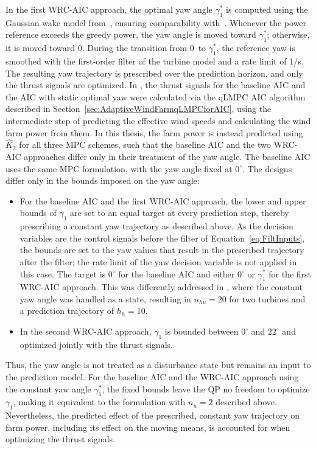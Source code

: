In the first WRC-AIC approach, the optimal yaw angle $\gamma_1^*$ is computed using the Gaussian wake model from~\cite{bastankhah2016experimental}, ensuring comparability with~\cite{boersma2019constrained}. Whenever the power reference exceeds the greedy power, the yaw angle is moved toward $\gamma_1^*$; otherwise, it is moved toward 0\textdegree. During the transition from 0\textdegree~to $\gamma_1^*$, the reference yaw is smoothed with the first-order filter of the turbine model and a rate limit of 1\textdegree/s. The resulting yaw trajectory is prescribed over the prediction horizon, and only the thrust signals are optimized. In \cite{dittmer2023koopman}, the thrust signals for the baseline AIC and the AIC with static optimal yaw were calculated via the qLMPC AIC algorithm described in Section~\ref{sec:AdaptiveWindFarmqLMPCforAIC}, using the intermediate step of predicting the effective wind speeds and calculating the wind farm power from them. In this thesis, the farm power is instead predicted using $\hat{K}_2$ for all three MPC schemes, such that the baseline AIC and the two WRC-AIC approaches differ only in their treatment of the yaw angle. The baseline AIC uses the same MPC formulation, with the yaw angle fixed at $0^\circ$. The designs differ only in the bounds imposed on the yaw angle:
\begin{itemize}
    \item For the baseline AIC and the first WRC-AIC approach, the lower and upper bounds of $\gamma_1$ are set to an equal target at every prediction step, thereby prescribing a constant yaw trajectory as described above. As the decision variables are the control signals before the filter of Equation~\eqref{eq:FiltInputs}, the bounds are set to the yaw values that result in the prescribed trajectory after the filter; the rate limit of the yaw decision variable is not applied in this case. The target is $0^\circ$ for the baseline AIC and either $0^\circ$ or $\gamma_1^*$ for the first WRC-AIC approach. This was differently addressed in \cite{dittmer2023koopman}, where the constant yaw angle was handled as a state, resulting in $n_{hu} = 20$ for two turbines and a prediction trajectory of $h_h = 10$. 
    \item In the second WRC-AIC approach, $\gamma_1$ is bounded between $0^\circ$ and $22^\circ$ and optimized jointly with the thrust signals.
\end{itemize}
Thus, the yaw angle is not treated as a disturbance state but remains an input to the prediction model. For the baseline AIC and the WRC-AIC approach using the constant yaw angle  $\gamma_1^*$, the fixed bounds leave the QP no freedom to optimize $\gamma_1$, making it equivalent to the formulation with $n_u = 2$ described above. Nevertheless, the predicted effect of the prescribed, constant yaw trajectory on farm power, including its effect on the moving means, is accounted for when optimizing the thrust signals.


